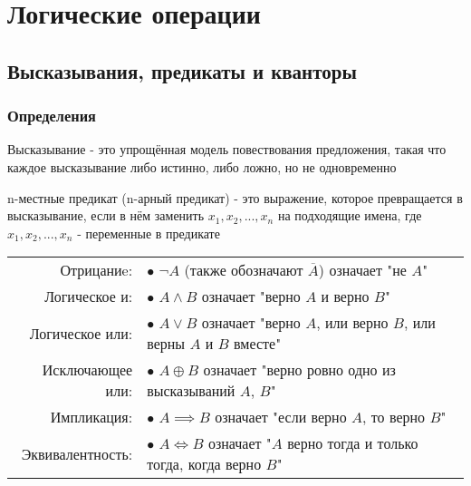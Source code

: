 \chapter{Логические операции}

\section{Высказывания, предикаты и кванторы}

\subsection{Определения}

{
    Высказывание - это упрощённая модель повествования предложения,
    такая что каждое высказывание либо истинно, либо ложно, но не одновременно

    n-местные предикат (n-арный предикат) - это выражение, которое превращается в
    высказывание, если в нём заменить $ x_1, x_2, ..., x_n $ на подходящие имена, где
    $ x_1, x_2, ..., x_n $ - переменные в предикате
}

{
\begin{tabular}{rl}
    Отрицаниe:       & $\bullet$ $ \lnot A $ (также обозначают $ \overline{A} $) означает "не $A$" \\
    Логическое и:    & $\bullet$ $ A \wedge B $ означает "верно $A$ и верно $B$" \\
    Логическое или:  & $\bullet$ $ A \vee B $ означает "верно $A$, или верно $B$, или верны $A$ и $B$ вместе" \\
    Исключающее или: & $\bullet$ $ A \oplus B $ означает "верно ровно одно из высказываний $A$, $B$" \\
    Импликация:      & $\bullet$ $ A \implies B $ означает "если верно $A$, то верно $B$" \\
    Эквивалентность: & $\bullet$ $ A \iff B $ означает "$A$ верно тогда и только тогда, когда верно $B$" \\
\end{tabular}
}


